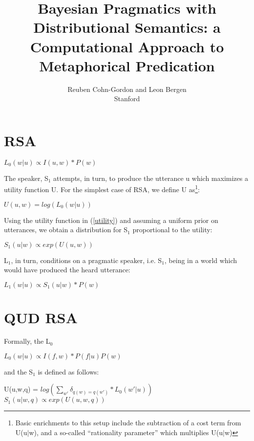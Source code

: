 \documentclass[10pt,letterpaper,twocolumn]{article}
\title{Bayesian Pragmatics with Distributional Semantics: a Computational Approach to Metaphorical Predication}
\author{Reuben Cohn-Gordon and Leon Bergen \\ Stanford}
\date{}
\begin{document}
\maketitle

\section{RSA}


\begin{exe}
\ex  $L_0(w\vert u) \propto  I(u,w)*P(w)$
\end{exe}


The speaker, S$_1$ attempts, in turn, to produce the utterance u which maximizes a utility function U. For the simplest case of RSA, we define U as\footnote{Basic enrichments to this setup include the subtraction of a cost term from U(u$\vert$w), and a so-called ``rationality parameter'' which multiplies U(u$\vert$w)}:

\begin{exe}
\ex $U(u,w) = log(L_0(w\vert u))$ \label{utility}
\end{exe}

Using the utility function in (\ref{utility}) and assuming a uniform prior on utterances, we obtain a distribution for S$_1$ proportional to the utility:
\begin{exe}
\ex $S_1(u\vert w) \propto exp(U(u,w))$
\end{exe}


L$_1$, in turn, conditions on a pragmatic speaker, i.e. S$_1$, being in a world which would have produced the heard utterance:
\begin{exe}
\ex $L_1(w\vert u) \propto S_1(u\vert w)*P(w)$
\end{exe}

\section{QUD RSA}

Formally, the L$_0$ 

\begin{exe}
\ex  $L_0(w\vert u) \propto  I(f,w)*P(f\vert u)P(w)$
\end{exe}


and the S$_1$ is defined as follows:

\begin{exe}
\ex U(u,w,q) = $log(\sum_{w'} \delta_{q(w)=q(w')} * L_0(w'\vert u))$
\ex $S_1(u\vert w,q) \propto exp(U(u,w,q))$
\end{exe}
\end{document}
